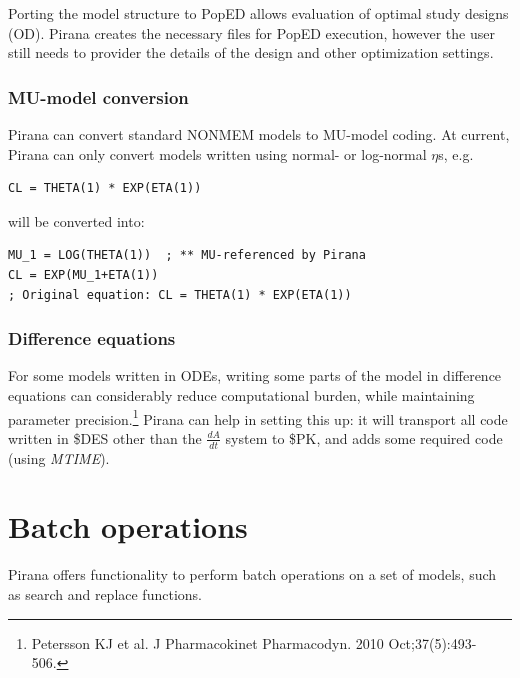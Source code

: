 {{{{Porting the model structure to PopED allows evaluation of optimal
study designs (OD). Pirana creates the necessary files for PopED execution, however
the user still needs to provider the details of the design and other optimization settings.

\subsubsection*{MU-model conversion}
Pirana can convert standard NONMEM models to MU-model coding. At
current, Pirana can only convert models written using normal- or
log-normal $\eta$s, e.g.

\begin{lstlisting}
CL = THETA(1) * EXP(ETA(1))
\end{lstlisting}

will be converted into:

\begin{lstlisting}
MU_1 = LOG(THETA(1))  ; ** MU-referenced by Pirana
CL = EXP(MU_1+ETA(1))
; Original equation: CL = THETA(1) * EXP(ETA(1))
\end{lstlisting}

\subsubsection*{Difference equations}
For some models written in ODEs, writing some parts of the model in
difference equations can considerably reduce computational burden, while
maintaining parameter precision.\footnote{Petersson KJ et al. J
  Pharmacokinet Pharmacodyn. 2010 Oct;37(5):493-506.} Pirana can help
in setting this up: it will transport all code written in \$DES other
than the $\frac{dA}{dt}$ system to \$PK, and adds some required
code (using \textit{MTIME}).

\section{Batch operations}

Pirana offers functionality to perform batch operations on a set of
models, such as search and replace functions.

}}}}
